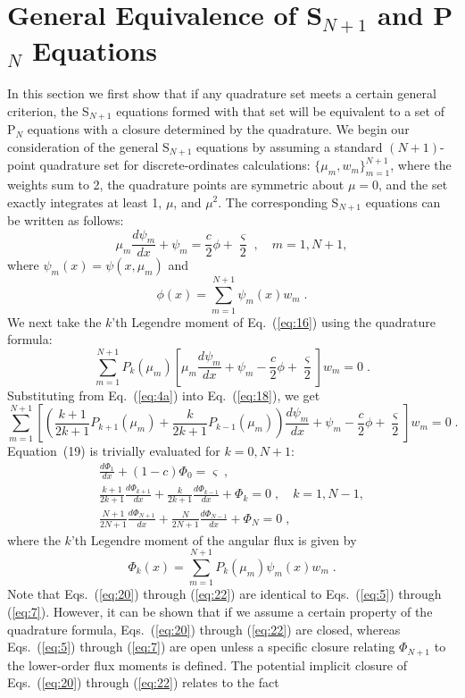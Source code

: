 \documentclass[12pt]{article}
\newcommand{\bracket}[1]{\left[ #1 \right]}
\newcommand{\fn}[1]{\left( #1 \right)}
\newcommand{\dddx}[1]{\frac{d #1}{d x}}
\newcommand{\be}{\begin{equation}}
\newcommand{\ee}{\end{equation}}
\newcommand{\pec}{\; ,}
\newcommand{\pep}{\; .}
\newcommand{\LEQ}[1]{\label{eq:#1}}
\newcommand{\EQ}[1]{Eq.~(\ref{eq:#1})}
\newcommand{\REQ}[1]{\ref{eq:#1}}
\begin{document}
\section{General Equivalence of S$_{N+1}$ and P$_N$ Equations}
\label{sec:genequiv}

In this section we first show that if any quadrature set meets a certain general criterion, the S$_{N+1}$ equations formed with that set will be equivalent 
to a set of P$_N$ equations with a closure determined by the quadrature.  We begin our consideration of the general S$_{N+1}$ equations by assuming a standard $(N+1)$-point quadrature set for discrete-ordinates 
calculations: $\{\mu_m, w_m\}_{m=1}^{N+1}$, where the weights sum to 2, the quadrature points are symmetric about $\mu=0$, and the 
set exactly integrates at least 1, $\mu$, and $\mu^2$.  The corresponding S$_{N+1}$ equations can be written as follows:
\be
\mu_m\dddx{\psi_m} + \psi_m = \frac{c}{2} \phi + \frac{\varsigma}{2} \pec \quad m=1,N+1,
\LEQ{16}
\ee
where $\psi_m (x)= \psi(x,\mu_m)$ and 
\be
\phi(x) = \sum_{m=1}^{N+1} \psi_m(x) w_m  \pep
\LEQ{17}
\ee
We next take the $k$'th Legendre moment of \EQ{16} using the quadrature formula:
\be
\sum_{m=1}^{N+1} P_k(\mu_m) \bracket{ 
\mu_m\dddx{\psi_m} + \psi_m - \frac{c}{2} \phi + \frac{\varsigma}{2} } w_m = 0 \pep
\LEQ{18}
\ee
Substituting from \EQ{4a} into \EQ{18}, we get
\be
\sum_{m=1}^{N+1} \bracket{ 
\fn{\frac{k+1}{2k+1} P_{k+1}(\mu_m) + \frac{k}{2k+1} P_{k-1}(\mu_m)} \dddx{\psi_m}  + 
\psi_m - \frac{c}{2} \phi + \frac{\varsigma}{2} } w_m = 0 \pep
\LEQ{19}
\ee
Equation~(19) is trivially evaluated for $k=0,N+1$:
\begin{gather}
\LEQ{20}
\dddx{\Phi_1} + (1-c) \Phi_0 = \varsigma \pec \\
\LEQ{21}
\frac{k+1}{2k+1} \dddx{\Phi_{k+1}} + \frac{k}{2k+1} \dddx{\Phi_{k-1}} +  \Phi_k = 0 \pec \quad k=1,N-1, \\
\LEQ{22}
\frac{N+1}{2N+1} \dddx{\Phi_{N+1}} + \frac{N}{2N+1} \dddx{\Phi_{N-1}} + \Phi_N = 0 \pec
\end{gather}
where the $k$'th Legendre moment of the angular flux is given by 
\be
\Phi_k(x) = \sum_{m=1}^{N+1} P_k(\mu_m) \psi_m(x) w_m  \pep
\LEQ{23}
\ee
Note that Eqs.~(\REQ{20}) through (\REQ{22}) are identical to Eqs.~(\REQ{5}) through (\REQ{7}).  However, it can be 
shown that if we assume a certain property of the quadrature formula, Eqs.~(\REQ{20}) through (\REQ{22}) are closed, 
whereas Eqs.~(\REQ{5}) through (\REQ{7}) are open unless a specific closure relating $\Phi_{N+1}$ to the lower-order 
flux moments is defined. The potential implicit closure of Eqs.~(\REQ{20}) through (\REQ{22}) relates to the fact 
\end{document}
